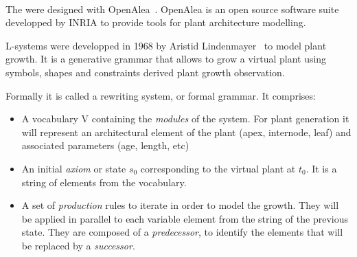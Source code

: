 
\paragraph{}

The  were designed with
OpenAlea~\cite{pradal2009plantgl}. OpenAlea is an open source software
suite developped by INRIA to provide tools for plant architecture
modelling. 

 L-systems were developped
in 1968 by Aristid Lindenmayer~\cite{prusinkiewicz2012algorithmic}
to model plant growth.  It is a generative grammar that allows to
grow a virtual plant using symbols, shapes and constraints derived
 plant growth observation.

Formally it is called a rewriting system, or formal grammar. It
comprises:

\begin{itemize}
    \item A vocabulary V containing the \emph{modules} of the
    system. For plant generation it will represent an architectural
    element of the plant (apex, internode, leaf) and associated
    parameters (age, length, etc) \item An initial \emph{axiom}
    or state $s_0$ corresponding to the virtual plant at $t_0$. It
    is a string of elements from the vocabulary.  \item A set
    of \emph{production} rules to iterate in order to model
    the growth. They will be applied in parallel to each variable
    element from the string of the previous state. They are composed
    of a \emph{predecessor}, to identify the elements that will be
    replaced by a \emph{successor}.
\end{itemize}

